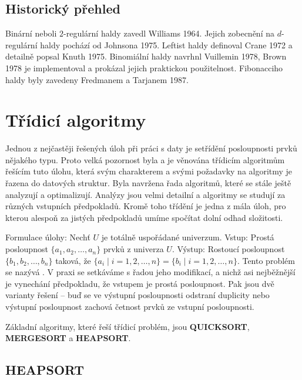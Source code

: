 \documentclass[a4paper,12pt]{article}
\def \emph#1{\underbar{#1}}
\begin{document}
\subsection{
Historický přehled
}

Binární neboli $2$-regulární haldy 
zavedl Williams 1964.  Jejich zobecnění na $d$-regulární haldy 
pochází od Johnsona 1975.  Leftist haldy definoval Crane 1972 a 
detailně popsal Knuth 1975.  Binomiální haldy navrhnl Vuillemin 
1978, Brown 1978 je implementoval a prokázal jejich praktickou 
použitelnost.  Fibonacciho haldy byly zavedeny Fredmanem a 
Tarjanem 1987.  
\newpage

\section{{Třídicí algoritmy}}

Jednou z nejčastěji řešených úloh při práci s 
daty je setřídění 
posloupnosti prvků nějakého typu. Proto velká pozornost byla a je věnována 
třídicím algoritmům řešícím tuto úlohu, která 
svým charakterem a svými 
požadavky na algoritmy je řazena do datových 
struktur. Byla navržena řada algoritmů, které se 
stále ještě analyzují a optimalizují. Analýzy jsou velmi detailní a algoritmy se 
studují za různých vstupních předpokladů. 
Kromě toho třídění je jedna z mála úloh, pro kterou 
alespoň za jistých 
předpokladů umíme spočítat dolní odhad složitosti.

Formulace úlohy:\newline 
Nechť $U$ je totálně uspořádané univerzum.\newline 
Vstup: Prostá posloupnost $\{a_1,a_2,\dots,a_n\}$ prvků z 
univerza $U$.\newline 
Výstup: Rostoucí posloupnost $\{b_1,b_2,\dots,b_n\}$ taková, že 
$\{a_i\mid i=1,2,\dots,n\}=\{b_i\mid i=1,2,\dots,n\}$.\newline 
Tento problém se nazývá \emph{třídění}. 
V praxi se setkáváme s řadou jeho modifikací, a nichž 
asi nejběžnější je vynechání předpokladu, že 
vstupem je prostá posloupnost. Pak jsou dvě varianty 
řešení -- bu\v d se ve výstupní posloupnosti odstraní 
duplicity nebo výstupní posloupnost zachová četnost prvků ze 
vstupní posloupnosti.

Základní algoritmy, které  řeší třídicí 
problém, jsou {\bf QUICKSORT}, {\bf MERGESORT} a {\bf HEAP\-SORT}. 

\subsection{
HEAPSORT
}
\end{document}
